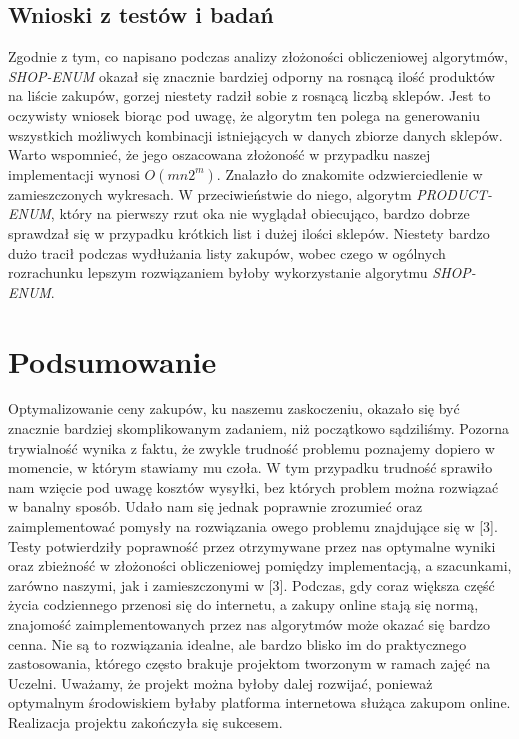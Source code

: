 \documentclass[a4paper]{article}
\let\oldsection\section
\renewcommand\section{\clearpage\oldsection}
\begin{document}
\subsection{Wnioski z testów i badań}
Zgodnie z tym, co napisano podczas analizy złożoności obliczeniowej algorytmów, \textit{SHOP-ENUM} okazał się znacznie bardziej odporny na rosnącą ilość produktów na liście zakupów, gorzej niestety radził sobie z rosnącą liczbą sklepów. Jest to oczywisty wniosek biorąc pod uwagę, że algorytm ten polega na generowaniu wszystkich możliwych kombinacji istniejących w danych zbiorze danych sklepów. Warto wspomnieć, że jego oszacowana złożoność w przypadku naszej implementacji wynosi $O(mn2^m)$. Znalazło do znakomite odzwierciedlenie w zamieszczonych wykresach. W przeciwieństwie do niego, algorytm \textit{PRODUCT-ENUM}, który na pierwszy rzut oka nie wyglądał obiecująco, bardzo dobrze sprawdzał się w przypadku krótkich list i dużej ilości sklepów. Niestety bardzo dużo tracił podczas wydłużania listy zakupów, wobec czego w ogólnych rozrachunku lepszym rozwiązaniem byłoby wykorzystanie algorytmu \textit{SHOP-ENUM}.
\section{Podsumowanie}
Optymalizowanie ceny zakupów, ku naszemu zaskoczeniu, okazało się być znacznie bardziej skomplikowanym zadaniem, niż początkowo sądziliśmy. Pozorna trywialność wynika z faktu, że zwykle trudność problemu poznajemy dopiero w momencie, w którym stawiamy mu czoła. W tym przypadku trudność sprawiło nam wzięcie pod uwagę kosztów wysyłki, bez których problem można rozwiązać w banalny sposób. Udało nam się jednak poprawnie zrozumieć oraz zaimplementować pomysły na rozwiązania owego problemu znajdujące się w [3]. Testy potwierdziły poprawność przez otrzymywane przez nas optymalne wyniki oraz zbieżność w złożoności obliczeniowej pomiędzy implementacją, a szacunkami, zarówno naszymi, jak i zamieszczonymi w [3]. Podczas, gdy coraz większa część życia codziennego przenosi się do internetu, a zakupy online stają się normą, znajomość zaimplementowanych przez nas algorytmów może okazać się bardzo cenna. Nie są to rozwiązania idealne, ale bardzo blisko im do praktycznego zastosowania, którego często brakuje projektom tworzonym w ramach zajęć na Uczelni. Uważamy, że projekt można byłoby dalej rozwijać, ponieważ optymalnym środowiskiem byłaby platforma internetowa służąca zakupom online. Realizacja projektu zakończyła się sukcesem.
\end{document}
